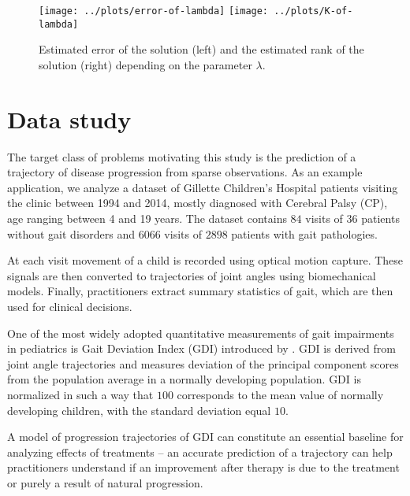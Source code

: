 \documentclass[preprint]{imsart}
\numberwithin{equation}{section}
\theoremstyle{plain}
\begin{document}
\begin{figure}[h!]
  \texttt{[image: ../plots/error-of-lambda]}
  \texttt{[image: ../plots/K-of-lambda]}
  \caption{Estimated error of the solution (left) and the estimated rank of the solution (right) depending on the parameter $\lambda$.}
  \label{fig:estimated-rank}
\end{figure}



\section{Data study}

The target class of problems motivating this study is the prediction of a trajectory of disease progression from sparse observations. As an example application, we analyze a dataset of Gillette Children's Hospital patients visiting the clinic between 1994 and 2014, mostly diagnosed with Cerebral Palsy (CP), age ranging between 4 and 19 years. The dataset contains $84$ visits of $36$ patients without gait disorders and $6066$ visits of $2898$ patients with gait pathologies. 

At each visit movement of a child is recorded using optical motion capture. These signals are then converted to trajectories of joint angles using biomechanical models. Finally, practitioners extract summary statistics of gait, which are then used for clinical decisions.

One of the most widely adopted quantitative measurements of gait impairments in pediatrics is Gait Deviation Index (GDI) introduced by \citet{schwartz2008gait}. GDI is derived from joint angle trajectories and measures deviation of the principal component scores from the population average in a normally developing population. GDI is normalized in such a way that $100$ corresponds to the mean value of normally developing children, with the standard deviation equal $10$. 

A model of progression trajectories of GDI can constitute an essential baseline for analyzing effects of treatments -- an accurate prediction of a trajectory can help practitioners understand if an improvement after therapy is due to the treatment or purely a result of natural progression.
\end{document}
